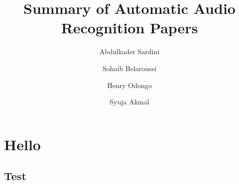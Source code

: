 \documentclass[10pt, a4paper]{article}
\title{Summary of Automatic Audio Recognition Papers}
\author{
    Abdulkader Sardini
    \and
    Sohaib Belaroussi
    \and
    Henry Odongo
    \and
    Syuja Akmal
    }
\begin{document}
\maketitle

\section{Hello}
\subsection{Test}
\end{document}
